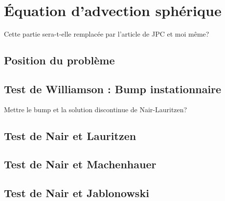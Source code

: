 
\chapter{\'Equation d'advection sphérique}

Cette partie sera-t-elle remplacée par l'article de JPC et moi même?

\section{Position du problème}

\section{Test de Williamson : Bump instationnaire}

Mettre le bump et la solution discontinue de Nair-Lauritzen?

\section{Test de Nair et Lauritzen}

\section{Test de Nair et Machenhauer}

\section{Test de Nair et Jablonowski}